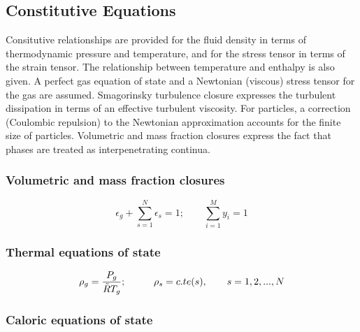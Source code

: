 \subsection{Constitutive Equations}
Consitutive relationships are provided for the fluid density in terms 
of thermodynamic pressure and temperature, and for the stress tensor 
in terms of the strain tensor.
The relationship between temperature and enthalpy is also given.
A perfect gas equation of state and a Newtonian (viscous) stress tensor
for the gas are assumed. Smagorinsky turbulence closure expresses the 
turbulent dissipation in terms of an effective turbulent viscosity.
For particles, a correction (Coulombic repulsion) to the Newtonian 
approximation accounts for the finite size of particles. Volumetric 
and mass fraction closures express the fact that phases are treated as 
interpenetrating continua.

\subsubsection{\hspace{1cm}Volumetric and mass fraction closures}

\begin{equation}
\epsilon_{g} + \sum_{s=1}^{N}\epsilon_{s} = 1; 
\qquad \sum_{i=1}^{M}y _{i} = 1
\label{eq:closeps}
\end{equation}

\subsubsection{\hspace{1cm}Thermal equations of state}

\begin{equation}
\rho_{g}=\frac{P_{g}}{\tilde{R} T_g}; 
\hspace{10mm}\rho_{s}=c.te(s),\qquad s=1,2,...,N
\label{eq:th_eosg}
\end{equation}


\subsubsection{\hspace{1cm}Caloric equations of state}

